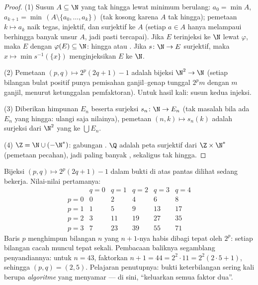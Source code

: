 \begin{proof}
(1) Susun $A \subseteq \N$ yang tak hingga lewat minimum berulang: $a_0 =
\min A$, $a_{k+1} = \min\,(A \setminus \{a_0, \dots, a_k\})$
(tak kosong karena $A$ tak hingga); pemetaan $k \mapsto a_k$ naik tegas,
injektif, dan surjektif ke $A$ (setiap $a \in A$ hanya melampaui
berhingga banyak unsur $A$, jadi pasti tercapai). Jika $E$ terinjeksi ke
$\N$ lewat $\varphi$, maka $E$  dengan $\varphi(E) \subseteq
\N$: hingga atau . Jika $s \colon \N \to E$ surjektif, maka $x
\mapsto \min s^{-1}(\{x\})$ menginjeksikan $E$ ke $\N$.

(2) Pemetaan $(p, q) \mapsto 2^p(2q + 1) - 1$ adalah bijeksi $\N^2
\to \N$ (setiap bilangan bulat positif punya pemisahan ganjil--genap
tunggal $2^p m$ dengan $m$ ganjil, menurut ketunggalan pemfaktoran).
Untuk hasil kali: susun kedua injeksi.

(3) Diberikan himpunan $E_n$ beserta surjeksi $s_n \colon \N \to E_n$
(tak masalah bila ada $E_n$ yang hingga: ulangi saja nilainya), pemetaan
$(n, k) \mapsto s_n(k)$ adalah surjeksi dari $\N^2$ yang  ke
$\bigcup E_n$.

(4) $\Z = \N \cup (-\N^*)$: gabungan . $\Q$ adalah peta
surjektif dari $\Z \times \N^*$ (pemetaan pecahan), jadi paling banyak
, sekaligus tak hingga.
\end{proof}

\begin{example}\label{ex:b2:structures:pairing}
Bijeksi $(p, q) \mapsto 2^p(2q + 1) - 1$ dalam bukti di atas
pantas dilihat sedang bekerja. Nilai-nilai pertamanya:
\[
\begin{array}{c|ccccc}
 & q = 0 & q = 1 & q = 2 & q = 3 & q = 4\\
\hline
p = 0 & 0 & 2 & 4 & 6 & 8\\
p = 1 & 1 & 5 & 9 & 13 & 17\\
p = 2 & 3 & 11 & 19 & 27 & 35\\
p = 3 & 7 & 23 & 39 & 55 & 71
\end{array}
\]
Baris $p$ menghimpun bilangan $n$ yang $n + 1$-nya habis dibagi
tepat oleh $2^p$: setiap bilangan cacah muncul tepat sekali.
Pembacaan baliknya segamblang penyandiannya: untuk $n = 43$,
faktorkan $n + 1 = 44 = 2^2\cdot 11 = 2^2(2\cdot5 + 1)$, sehingga
$(p, q) = (2, 5)$. Pelajaran penutupnya: bukti keterbilangan
sering kali berupa \emph{algoritme} yang menyamar --- di sini,
``keluarkan semua faktor dua''.
\end{example}

